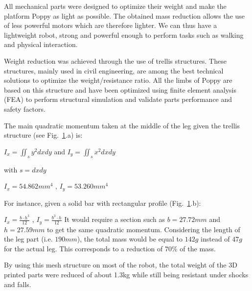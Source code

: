 All mechanical parts were designed to optimize their weight and make the platform Poppy as light as possible.
The obtained mass reduction allows the use of less powerful motors which are therefore lighter.
We can thus have a lightweight robot, strong and powerful enough to perform tasks such as walking and physical interaction.

Weight reduction was achieved through the use of trellis structures.
These structures, mainly used in civil engineering, are among the best technical solutions to optimize the weight/resistance ratio.
All the limbs of Poppy are based on this structure and have been optimized using finite element analysis (FEA) to perform structural simulation and validate parts performance and safety factors.


\begin{figure}[!h]
\centering
    \hfil
    \caption{}
    \label{fig:leg_section}
\end{figure}


The main quadratic momentum taken at the middle of the leg given the trellis structure (see Fig.~\ref{fig:leg_section}.a) is:

\begin{center}
    $I_x = \iint_s y^2 dxdy$ and  $I_y = \iint_s x^2 dxdy$

    with $s = dxdy$
\end{center}
\begin{center}
    $I_x = 54.862 mm^4$
    ,
    $I_y = 53.260 mm^4$
\end{center}

For instance, given a solid bar with rectangular profile (Fig.~\ref{fig:leg_section}.b):

{\centering
    $I_x = \frac{b \cdot h^3}{12}$
    ,
    $I_y = \frac{b^3 \cdot h}{12}$
}
It would require a section such as $b=27.72 mm$ and $h=27.59 mm$ to get the same quadratic momentum.
Considering the length of the leg part (i.e.
$190 mm$), the total mass would be equal to $142 g$ instead of $47 g$ for the actual leg.
This corresponds to a reduction of 70\% of the mass.

By using this mesh structure on most of the robot, the total weight of the 3D
printed parts were reduced of about 1.3kg while still being resistant under shocks and falls.


